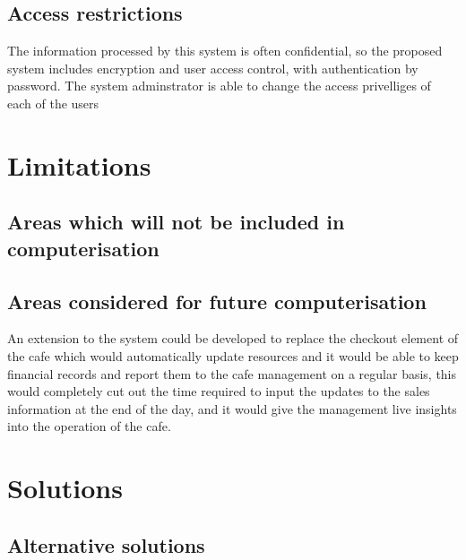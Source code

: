 \subsection{Access restrictions}
	The information processed by this system is often confidential, so the proposed system includes encryption and user access control, with 
	authentication by password. The system adminstrator is able to change the access privelliges of each of the users

\section{Limitations}

\subsection{Areas which will not be included in computerisation}

\subsection{Areas considered for future computerisation}
	An extension to the system could be developed to replace the checkout element of the cafe which would automatically update resources and
	it would be able to keep financial records and report them to the cafe management on a regular basis, this would completely cut out the time 
	required to input the updates to the sales information at the end of the day, and it would give the management live insights into 
	the operation of the cafe.

\section{Solutions}

\subsection{Alternative solutions}

